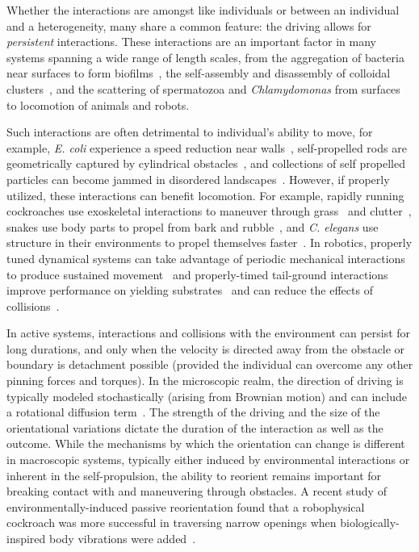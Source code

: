 \documentclass[aps,pre,twocolumn,superscriptaddress]{revtex4-1}
\begin{document}
Whether the interactions are amongst like individuals or between an individual and a heterogeneity, many share a common feature: the driving allows for \emph{persistent} interactions. These interactions are an important factor in many systems spanning a wide range of length scales, from the aggregation of bacteria near surfaces to form biofilms~\cite{drescher2011fluid}, the self-assembly and disassembly of colloidal clusters~\cite{palacci2013living}, and the scattering of spermatozoa and \emph{Chlamydomonas} from surfaces~\cite{Kantsler:2013ge} to locomotion of animals and robots.

Such interactions are often detrimental to individual's ability to move, for example, \emph{E. coli} experience a speed reduction near walls~\cite{frymier1995three}, self-propelled rods are geometrically captured by cylindrical obstacles~\cite{takagi2014hydrodynamic}, and collections of self propelled particles can become jammed in disordered landscapes~\cite{reichhardt2014active}. However, if properly utilized, these interactions can benefit locomotion.  For example, rapidly running cockroaches use exoskeletal interactions to maneuver through grass~\cite{Li:2015jn} and clutter~\cite{Spagna:2007kf}, snakes use body parts to propel from bark and rubble~\cite{kelley1997effects}, and \emph{C. elegans} use structure in their environments to propel themselves faster~\cite{park2008enhanced}. In robotics, properly tuned dynamical systems can take advantage of periodic mechanical interactions to produce sustained movement~\cite{Spagna:2007kf,McGeer:1990uk,Coleman:1998uk,Saranli:2001vk} and properly-timed tail-ground interactions improve performance on yielding substrates~\cite{mcinroe2016tail} and can reduce the effects of collisions~\cite{Qian:2015gz}.

In active systems, interactions and collisions with the environment can persist for long durations, and only when the velocity is directed away from the obstacle or boundary is detachment possible (provided the individual can overcome any other pinning forces and torques). In the microscopic realm, the direction of driving is typically modeled stochastically (arising from Brownian motion) and can include a rotational diffusion term~\cite{bechinger2016active}. The strength of the driving and the size of the orientational variations dictate the duration of the interaction as well as the outcome. While the mechanisms by which the orientation can change is different in macroscopic systems, typically either induced by environmental interactions or inherent in the self-propulsion, the ability to reorient remains important for breaking contact with and maneuvering through obstacles. A recent study of environmentally-induced passive reorientation found that a robophysical cockroach was more successful in traversing narrow openings when biologically-inspired body vibrations were added~\cite{Li2017mm}.
\end{document}
